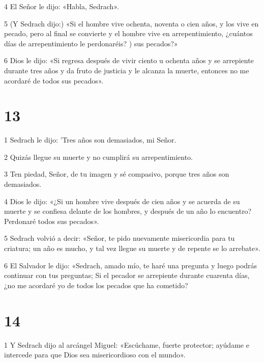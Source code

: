 \par 4 El Señor le dijo: «Habla, Sedrach».

\par 5 (Y Sedrach dijo:) «Si el hombre vive ochenta, noventa o cien años, y los vive en pecado, pero al final se convierte y el hombre vive en arrepentimiento, ¿cuántos días de arrepentimiento le perdonaréis? ) sus pecados?»

\par 6 Dios le dijo: «Si regresa después de vivir ciento u ochenta años y se arrepiente durante tres años y da fruto de justicia y le alcanza la muerte, entonces no me acordaré de todos sus pecados».

\chapter{13}

\par 1 Sedrach le dijo: 'Tres años son demasiados, mi Señor.

\par 2 Quizás llegue su muerte y no cumplirá su arrepentimiento.

\par 3 Ten piedad, Señor, de tu imagen y sé compasivo, porque tres años son demasiados.

\par 4 Dios le dijo: «¿Si un hombre vive después de cien años y se acuerda de su muerte y se confiesa delante de los hombres, y después de un año lo encuentro? Perdonaré todos sus pecados».

\par 5 Sedrach volvió a decir: «Señor, te pido nuevamente misericordia para tu criatura; un año es mucho, y tal vez llegue su muerte y de repente se lo arrebate».

\par 6 El Salvador le dijo: «Sedrach, amado mío, te haré una pregunta y luego podrás continuar con tus preguntas; Si el pecador se arrepiente durante cuarenta días, ¿no me acordaré yo de todos los pecados que ha cometido?

\chapter{14}

\par 1 Y Sedrach dijo al arcángel Miguel: «Escúchame, fuerte protector; ayúdame e intercede para que Dios sea misericordioso con el mundo».

